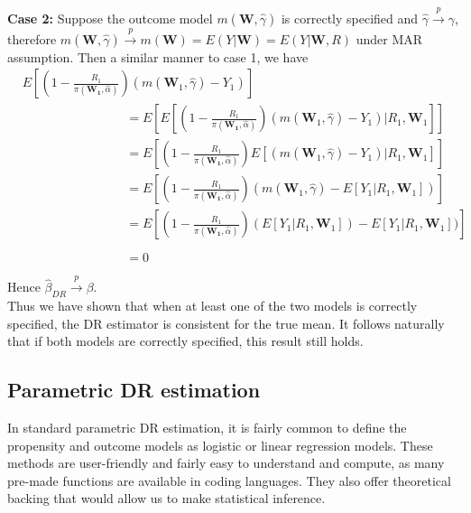 \documentclass[12pt,twoside]{article}
\begin{document}
\textbf{Case 2:} Suppose the outcome model $m(\mathbf{W}, \hat\gamma)$ is correctly specified and $\hat{\gamma} \xrightarrow{p} \gamma$, therefore  $m(\mathbf{W}, \hat\gamma) \xrightarrow{p} m(\mathbf{W}) = E(Y|\mathbf{W}) = E(Y|\mathbf{W}, R)$ under MAR assumption. Then a similar manner to case 1, we have
\begin{align*}
     & E\left[\left(1 - \frac{R_1}{\pi(\mathbf{W_1},\hat{\alpha})} \right) (m(\mathbf{W}_1, \hat\gamma)-Y_1)\right] \\
     & \phantom{E [(1 - \frac{R_1}{\pi(\mathbf{W_1},\hat{\alpha})})} = E\left[ E\left[\left(1 - \frac{R_1}{\pi(\mathbf{W_1},\hat{\alpha})} \right)(m(\mathbf{W}_1, \hat\gamma)-Y_1)|R_1, \mathbf{W}_1\right]\right] \\
     & \phantom{E [(1 - \frac{R_1}{\pi(\mathbf{W_1},\hat{\alpha})})} = E\left[\left(1 - \frac{R_1}{\pi(\mathbf{W_1},\hat{\alpha})} \right) E\left[(m(\mathbf{W}_1, \hat\gamma)-Y_1)|R_1, \mathbf{W}_1\right]\right] \\
     & \phantom{E [(1 - \frac{R_1}{\pi(\mathbf{W_1},\hat{\alpha})})} = E\left[\left(1 - \frac{R_1}{\pi(\mathbf{W_1},\hat{\alpha})} \right) (m(\mathbf{W}_1, \hat\gamma)-E\left[Y_1|R_1, \mathbf{W}_1\right])\right] \\
     & \phantom{E [(1 - \frac{R_1}{\pi(\mathbf{W_1},\hat{\alpha})})} = E\left[\left(1 - \frac{R_1}{\pi(\mathbf{W_1},\hat{\alpha})} \right) (E\left[Y_1|R_1, \mathbf{W}_1\right])-E\left[Y_1|R_1, \mathbf{W}_1\right])\right] \\
     & \phantom{E [(1 - \frac{R_1}{\pi(\mathbf{W_1},\hat{\alpha})})} = 0
\end{align*}
Hence $\hat{\beta}_{DR} \xrightarrow{p} \beta$.\\

Thus we have shown that when at least one of the two models is correctly specified, the DR estimator is consistent for the true mean. It follows naturally that if both models are correctly specified, this result still holds.
\subsection{Parametric DR estimation}

In standard parametric DR estimation, it is fairly common to define the propensity and outcome models as logistic or linear regression models. These methods are user-friendly and fairly easy to understand and compute, as many pre-made functions are available in coding languages. They also offer theoretical backing that would allow us to make statistical inference.\\
\end{document}
